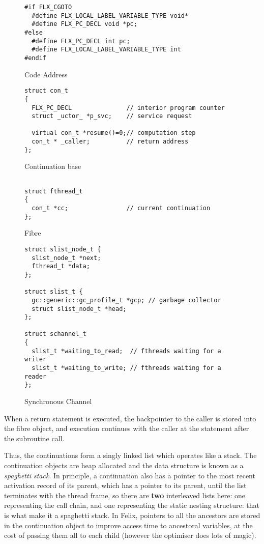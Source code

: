 \documentclass[oneside]{book}
\begin{document}
\begin{figure}
\begin{verbatim}
#if FLX_CGOTO
  #define FLX_LOCAL_LABEL_VARIABLE_TYPE void*
  #define FLX_PC_DECL void *pc;
#else
  #define FLX_PC_DECL int pc;
  #define FLX_LOCAL_LABEL_VARIABLE_TYPE int
#endif

\end{verbatim}
\caption{Code Address}
\end{figure}

\begin{figure}
\begin{verbatim}
struct con_t 
{
  FLX_PC_DECL               // interior program counter
  struct _uctor_ *p_svc;    // service request

  virtual con_t *resume()=0;// computation step
  con_t * _caller;          // return address
};
\end{verbatim}
\caption{Continuation base}
\end{figure}

\begin{figure}
\begin{verbatim}

struct fthread_t 
{
  con_t *cc;                // current continuation
};
\end{verbatim}
\caption{Fibre}
\end{figure}

\begin{figure}
\begin{verbatim}
struct slist_node_t {
  slist_node_t *next;
  fthread_t *data;
};

struct slist_t {
  gc::generic::gc_profile_t *gcp; // garbage collector
  struct slist_node_t *head;
};

struct schannel_t
{
  slist_t *waiting_to_read;  // fthreads waiting for a writer
  slist_t *waiting_to_write; // fthreads waiting for a reader
};
\end{verbatim}
\caption{Synchronous Channel}
\end{figure}

When a return statement is executed, the backpointer to the
caller is stored into the fibre object, and execution continues
with the caller at the statement after the subroutine call.

Thus, the continuations form a singly linked list which operates
like a stack. The continuation objects are heap allocated and
the data structure is known as a {\em spaghetti stack}.
In principle, a continuation also has a pointer to the most recent
activation record of its parent, which has a pointer to its 
parent, until the list terminates with the thread frame,
so there are {\bf two} interleaved lists here: one representing
the call chain, and one representing the static nesting structure:
that is what make it a spaghetti stack. In Felix, pointers to all
the ancestors are stored in the continuation object to improve
access time to ancestoral variables, at the cost of passing them
all to each child (however the optimiser does lots of magic).
\end{document}
